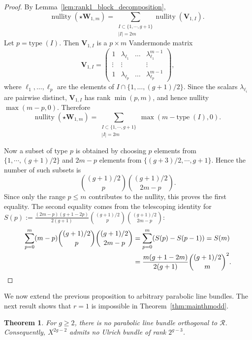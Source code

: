 \documentclass[12pt, letterpaper]{amsart}
\newtheorem{theorem}{Theorem}[section]
\theoremstyle{definition}
\newcommand{\cR}{\mathcal{R} }
\newcommand{\bV}{\mathbf{V} }
\newcommand{\bW}{\mathbf{W} }
\newcommand{\lbd}{\lambda}
\def\type{\mathrm{type}\;}
\def\nullity{\mathrm{nullity}\;}
\begin{document}
\begin{proof}
By Lemma~\ref{lem:rank1_block_decomposition},
\[\nullity(\star\bW_{1,m})=\sum_{\substack{I\subset\{1,\cdots,g+1\}\\|I|=2m}}\nullity(\bV_{1,I}).\]
Let \(p=\type(I)\). Then \(\bV_{1,I}\) is a \(p\times m\) Vandermonde matrix
\[
\bV_{1,I}= \begin{pmatrix}
  1 & \lbd_{\ell_1} & \dots & \lbd_{\ell_1}^{m-1}\\
  \vdots & \vdots & & \vdots\\
  1 & \lbd_{\ell_p} & \dots & \lbd_{\ell_p}^{m-1}
\end{pmatrix},
\]
where \(\ell_1,\dots,\ell_p\) are the elements of \(I\cap\{1,\dots,(g+1)/2\}\). Since the scalars \(\lbd_{\ell_i}\) are pairwise distinct, \(\bV_{1,I}\) has rank \(\min(p,m)\), and hence nullity \(\max(m-p,0)\). Therefore
\[\nullity(\star\bW_{1,m})=\sum_{\substack{I\subset\{1,\cdots,g+1\}\\|I|=2m}}\max(m-\type(I),0).\]

Now a subset of type \(p\) is obtained by choosing \(p\) elements from \(\{1,\cdots,(g+1)/2\}\) and \(2m-p\) elements from \(\{(g+3)/2,\cdots,g+1\}\). Hence the number of such subsets is
\[\binom{(g+1)/2}{p}\binom{(g+1)/2}{2m-p}.\]
Since only the range \(p\le m\) contributes to the nullity, this proves the first equality. The second equality comes from the telescoping identity for \(S(p):=\frac{(2m-p)(g+1-2p)}{2(g+1)}\genfrac(){0pt}{}{(g+1)/2}{p}\genfrac(){0pt}{}{(g+1)/2}{2m-p}\):
\[
\begin{split}
  \sum_{p=0}^{m}(m-p)\binom{(g+1)/2}{p}\binom{(g+1)/2}{2m-p}&=\sum_{p=0}^{m}(S(p)-S(p-1))=S(m)\\
  &=\frac{m(g+1-2m)}{2(g+1)}\binom{(g+1)/2}{m}^{2}.\qedhere
\end{split}
\]
\end{proof}

We now extend the previous proposition to arbitrary parabolic line bundles. The next result shows that \(r = 1\) is impossible in Theorem~\ref{thm:mainthmodd}.

\begin{theorem}\label{thm:line_bundle_case}
For \(g\ge 2\), there is no parabolic line bundle orthogonal to \(\cR\). Consequently, \(X^{2g-2}\) admits no Ulrich bundle of rank \(2^{g-3}\).
\end{theorem}
\end{document}
